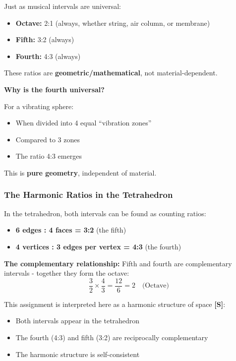 	Just as musical intervals are universal:
	\begin{itemize}
		\item \textbf{Octave:} 2:1 (always, whether string, air column, or membrane)
		\item \textbf{Fifth:} 3:2 (always)
		\item \textbf{Fourth:} 4:3 (always)
	\end{itemize}
	
	These ratios are \textbf{geometric/mathematical}, not material-dependent.
	
	\textbf{Why is the fourth universal?}
	
	For a vibrating sphere:
	\begin{itemize}
		\item When divided into 4 equal ``vibration zones''
		\item Compared to 3 zones
		\item The ratio 4:3 emerges
	\end{itemize}
	
	This is \textbf{pure geometry}, independent of material.
	
	\subsubsection{The Harmonic Ratios in the Tetrahedron}
	\label{subsubsec:tetrahedron_harmonics}
	
	In the tetrahedron, both intervals can be found as counting ratios:
	\begin{itemize}
		\item \textbf{6 edges : 4 faces = 3:2} (the fifth)
		\item \textbf{4 vertices : 3 edges per vertex = 4:3} (the fourth)
	\end{itemize}
	
	\textbf{The complementary relationship:}
	Fifth and fourth are complementary intervals - together they form the octave:
	\begin{equation}
		\frac{3}{2} \times \frac{4}{3} = \frac{12}{6} = 2 \quad \text{(Octave)}
	\end{equation}
	
	This assignment is interpreted here as a harmonic structure of space \textbf{[S]}:
	\begin{itemize}
		\item Both intervals appear in the tetrahedron
		\item The fourth (4:3) and fifth (3:2) are reciprocally complementary
		\item The harmonic structure is self-consistent
	\end{itemize}
	
